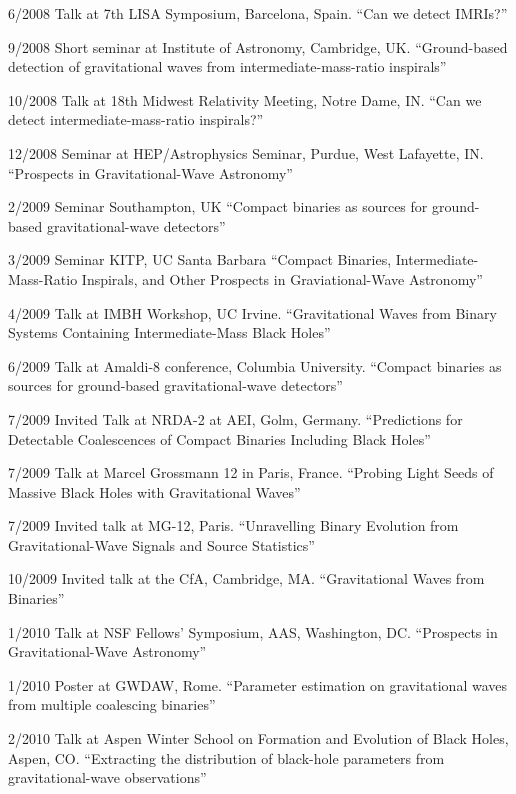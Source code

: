 \documentclass[margin,line]{res}
\begin{document}
\begin{resume}
6/2008 	Talk at 7th LISA Symposium, Barcelona, Spain. 	``Can we detect IMRIs?''

9/2008 	Short seminar  at Institute of Astronomy, Cambridge, UK. 	``Ground-based detection of gravitational waves from intermediate-mass-ratio inspirals'' 

10/2008 	Talk 	at 18th Midwest Relativity Meeting, Notre Dame, IN. 	``Can we detect intermediate-mass-ratio inspirals?''

12/2008 	Seminar at HEP/Astrophysics Seminar, Purdue, West Lafayette, IN. 	``Prospects in Gravitational-Wave Astronomy'' 


2/2009 	Seminar 	Southampton, UK 	``Compact binaries as sources for ground-based gravitational-wave detectors''

3/2009 	Seminar 	KITP, UC Santa Barbara 	``Compact Binaries, Intermediate-Mass-Ratio Inspirals, and Other Prospects in Graviational-Wave Astronomy''

4/2009 	Talk 	at IMBH Workshop, UC Irvine. 	``Gravitational Waves from Binary Systems Containing Intermediate-Mass Black Holes'' 

6/2009	Talk at Amaldi-8 conference, Columbia University. ``Compact binaries as sources for ground-based gravitational-wave detectors''

7/2009	Invited Talk at NRDA-2 at AEI, Golm, Germany. ``Predictions for Detectable Coalescences of Compact Binaries Including Black Holes''

7/2009	Talk at Marcel Grossmann 12 in Paris, France.  ``Probing Light Seeds of Massive Black Holes with Gravitational Waves'' 

7/2009	Invited talk at MG-12, Paris.  ``Unravelling Binary Evolution from Gravitational-Wave Signals and Source Statistics''

10/2009	Invited talk at the CfA, Cambridge, MA.  ``Gravitational Waves from Binaries''

1/2010	Talk at NSF Fellows' Symposium, AAS, Washington, DC. ``Prospects in Gravitational-Wave Astronomy''

1/2010	Poster at GWDAW, Rome.  ``Parameter estimation on gravitational waves from multiple coalescing binaries''

2/2010	Talk at Aspen Winter School on Formation and Evolution of Black Holes, Aspen, CO.  ``Extracting the distribution of black-hole parameters from gravitational-wave observations''


\end{resume}
\end{document}
